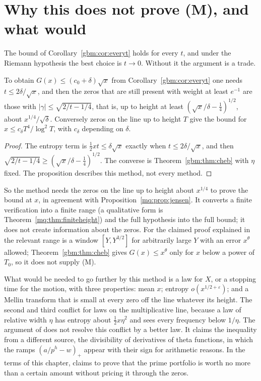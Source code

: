 \section{Why this does not prove (M), and what would}\label{gbm:sec:why}

The bound of Corollary~\ref{gbm:cor:everyt} holds for every $t$, and under the Riemann hypothesis the best choice is $t\to0$. Without it the argument is a trade.

\begin{proposition}\label{gbm:prop:rate}
To obtain $G(x)\le(c_0+\delta)\sqrt x$ from Corollary~\ref{gbm:cor:everyt} one needs $t\le2\delta/\sqrt x$, and then the zeros that are still present with weight at least $e^{-1}$ are those with $|\gamma|\le\sqrt{2/t-1/4}$, that is, up to height at least $(\sqrt x/\delta-\frac14)^{1/2}$, about $x^{1/4}/\sqrt\delta$. Conversely zeros on the line up to height $T$ give the bound for $x\le c_\delta T^4/\log^2T$, with $c_\delta$ depending on $\delta$.
\end{proposition}

\begin{proof}
The entropy term is $\frac12xt\le\delta\sqrt x$ exactly when $t\le2\delta/\sqrt x$, and then $\sqrt{2/t-1/4}\ge(\sqrt x/\delta-\frac14)^{1/2}$. The converse is Theorem~\ref{gbm:thm:cheb} with $\eta$ fixed. The proposition describes this method, not every method.
\end{proof}

So the method needs the zeros on the line up to height about $x^{1/4}$ to prove the bound at $x$, in agreement with Proposition~\ref{mq:prop:jensen}. It converts a finite verification into a finite range (a qualitative form is Theorem~\ref{mq:thm:finiteheight}) and the full hypothesis into the full bound; it does not create information about the zeros. For the claimed proof explained in \cite{Rub26} the relevant range is a window $[Y,Y^{3/2}]$ for arbitrarily large $Y$ with an error $x^\theta$ allowed; Theorem~\ref{gbm:thm:cheb} gives $G(x)\le x^\theta$ only for $x$ below a power of $T_0$, so it does not supply (M).

What would be needed to go further by this method is a law for $X$, or a stopping time for the motion, with three properties: mean $x$; entropy $o(x^{1/2+\varepsilon})$; and a Mellin transform that is small at every zero off the line whatever its height. The second and third conflict for laws on the multiplicative line, because a law of relative width $\eta$ has entropy about $\frac12x\eta^2$ and sees every frequency below $1/\eta$. The argument of \cite{Rub26} does not resolve this conflict by a better law. It claims the inequality from a different source, the divisibility of derivatives of theta functions, in which the ramps $(a/p^h-w)_+$ appear with their sign for arithmetic reasons. In the terms of this chapter, \cite{Rub26} claims to prove that the prime portfolio is worth no more than a certain amount without pricing it through the zeros.

